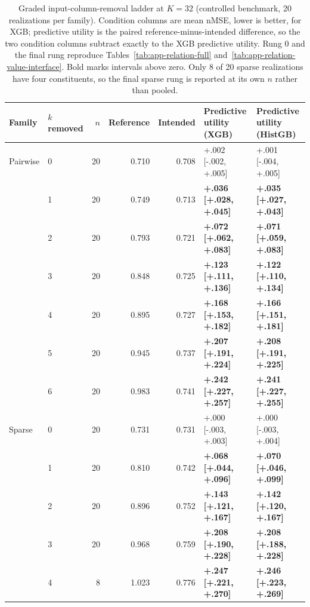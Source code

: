 
\begin{table}[t]
\caption{Graded input-column-removal ladder at $K=32$ (controlled benchmark, 20 realizations per family). Condition columns are mean nMSE, lower is better, for XGB; predictive utility is the paired reference-minus-intended difference, so the two condition columns subtract exactly to the XGB predictive utility. Rung $0$ and the final rung reproduce Tables~\ref{tab:app-relation-full} and~\ref{tab:app-relation-value-interface}. Bold marks intervals above zero. Only 8 of 20 sparse realizations have four constituents, so the final sparse rung is reported at its own $n$ rather than pooled.}
\label{tab:app-relation-ladder}
\centering\small
\setlength{\tabcolsep}{4pt}
\begin{tabular}{llrrrll}
\toprule
Family & $k$ removed & $n$ & Reference & Intended & Predictive utility (XGB) & Predictive utility (HistGB) \\
\midrule
Pairwise & 0 & 20 & 0.710 & 0.708 & +.002 [-.002, +.005] & +.001 [-.004, +.005] \\
 & 1 & 20 & 0.749 & 0.713 & \textbf{+.036 [+.028, +.045]} & \textbf{+.035 [+.027, +.043]} \\
 & 2 & 20 & 0.793 & 0.721 & \textbf{+.072 [+.062, +.083]} & \textbf{+.071 [+.059, +.083]} \\
 & 3 & 20 & 0.848 & 0.725 & \textbf{+.123 [+.111, +.136]} & \textbf{+.122 [+.110, +.134]} \\
 & 4 & 20 & 0.895 & 0.727 & \textbf{+.168 [+.153, +.182]} & \textbf{+.166 [+.151, +.181]} \\
 & 5 & 20 & 0.945 & 0.737 & \textbf{+.207 [+.191, +.224]} & \textbf{+.208 [+.191, +.225]} \\
 & 6 & 20 & 0.983 & 0.741 & \textbf{+.242 [+.227, +.257]} & \textbf{+.241 [+.227, +.255]} \\
\addlinespace[2pt]
Sparse & 0 & 20 & 0.731 & 0.731 & +.000 [-.003, +.003] & +.000 [-.003, +.004] \\
 & 1 & 20 & 0.810 & 0.742 & \textbf{+.068 [+.044, +.096]} & \textbf{+.070 [+.046, +.099]} \\
 & 2 & 20 & 0.896 & 0.752 & \textbf{+.143 [+.121, +.167]} & \textbf{+.142 [+.120, +.167]} \\
 & 3 & 20 & 0.968 & 0.759 & \textbf{+.208 [+.190, +.228]} & \textbf{+.208 [+.188, +.228]} \\
 & 4 & 8 & 1.023 & 0.776 & \textbf{+.247 [+.221, +.270]} & \textbf{+.246 [+.223, +.269]} \\
\bottomrule
\end{tabular}
\end{table}

